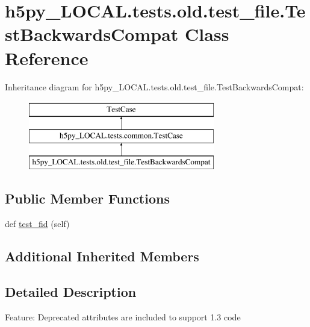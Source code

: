 \hypertarget{classh5py__LOCAL_1_1tests_1_1old_1_1test__file_1_1TestBackwardsCompat}{}\section{h5py\+\_\+\+L\+O\+C\+A\+L.\+tests.\+old.\+test\+\_\+file.\+Test\+Backwards\+Compat Class Reference}
\label{classh5py__LOCAL_1_1tests_1_1old_1_1test__file_1_1TestBackwardsCompat}
Inheritance diagram for h5py\+\_\+\+L\+O\+C\+A\+L.\+tests.\+old.\+test\+\_\+file.\+Test\+Backwards\+Compat\+:\begin{figure}[H]
\begin{center}
\leavevmode
\includegraphics[height=3.000000cm]{classh5py__LOCAL_1_1tests_1_1old_1_1test__file_1_1TestBackwardsCompat}
\end{center}
\end{figure}
\subsection*{Public Member Functions}
\begin{DoxyCompactItemize}
\item 
def \hyperlink{classh5py__LOCAL_1_1tests_1_1old_1_1test__file_1_1TestBackwardsCompat_acd78a372317ca86a990df43d22955039}{test\+\_\+fid} (self)
\end{DoxyCompactItemize}
\subsection*{Additional Inherited Members}


\subsection{Detailed Description}
\begin{DoxyVerb}    Feature: Deprecated attributes are included to support 1.3 code
\end{DoxyVerb}
 

